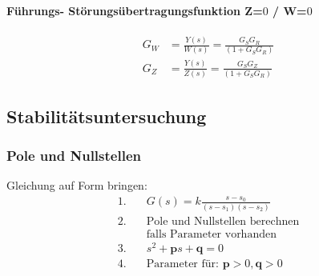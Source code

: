 \documentclass{article}
\begin{document}
\begin{landscape}
\begin{multicols}{2}
\begin{multicols}{2}
\begin{multicols}{2}
\paragraph{Führungs- Störungsübertragungsfunktion Z=$0$ / W=$0$}
	\begin{align*}
		G_W &= \frac{Y(s)}{W(s)} = \frac{G_SG_R}{(1+G_SG_R)} \\
		G_{Z} &=\frac{Y(s)}{Z(s)} =\frac{G_{S}G_Z}{\left(1+G_{S} G_{R}\right)}
\end{align*}

\subsection*{Stabilitätsuntersuchung}

\subsubsection*{Pole und Nullstellen}
Gleichung auf Form bringen:
	\begin{align*}
		1. &\quad  G(s) = k \frac{s-s_0}{(s-s_1)(s-s_2)} \\
		2. &\quad \text{Pole und Nullstellen berechnen} \\
		   &\quad \text{falls Parameter vorhanden} \\
		3. &\quad s^2 + \mathbf{p}s + \mathbf{q} = 0 \\
		4. &\quad \text{Parameter für: } \mathbf{p}>0, \mathbf{q}>0 \\
	\end{align*}



\end{multicols}
\end{multicols}
\end{multicols}
\end{landscape}
\end{document}
